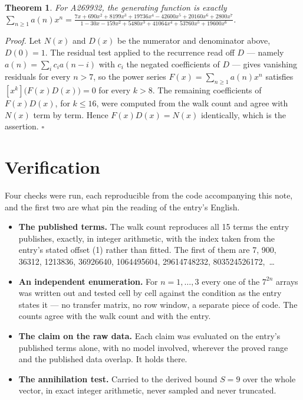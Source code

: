 \documentclass[11pt]{article}
\newtheorem{theorem}{Theorem}
\theoremstyle{definition}
\begin{document}
\begin{theorem} For A269932, the generating function is exactly $\sum_{n\ge 1} a(n)x^n = \frac{7x + 690x^{2} + 8199x^{3} + 19736x^{4} - 42600x^{5} + 20160x^{6} + 2800x^{7}}{1 - 30x - 159x^{2} + 5480x^{3} + 41064x^{4} + 53760x^{5} + 19600x^{6}}$.\end{theorem}

{\itshape Proof.} Let $N(x)$ and $D(x)$ be the numerator and denominator above, $D(0)=1$. The residual test applied to the recurrence read off $D$ --- namely $a(n) = \sum_i c_i a(n-i)$ with $c_i$ the negated coefficients of $D$ --- gives vanishing residuals for every $n > 7$, so the power series $F(x)=\sum_{n\ge 1}a(n)x^n$ satisfies $[x^k]\bigl(F(x)D(x)\bigr) = 0$ for every $k > 8$. The remaining coefficients of $F(x)D(x)$, for $k \le 16$, were computed from the walk count and agree with $N(x)$ term by term. Hence $F(x)D(x) = N(x)$ identically, which is the assertion. $\square$

\section{Verification}

Four checks were run, each reproducible from the code accompanying this note, and the first two are what pin the reading of the entry's English.

\begin{itemize}

\item {\bfseries The published terms.} The walk count reproduces all 15 terms the entry publishes, exactly, in integer arithmetic, with the index taken from the entry's stated offset (1) rather than fitted. The first of them are 7, 900, 36312, 1213836, 36926640, 1064495604, 29614748232, 803524526172,~\dots

\item {\bfseries An independent enumeration.} For $n = 1,\dots,3$ every one of the $7^{2n}$ arrays was written out and tested cell by cell against the condition as the entry states it --- no transfer matrix, no row window, a separate piece of code. The counts agree with the walk count and with the entry.

\item {\bfseries The claim on the raw data.} Each claim was evaluated on the entry's published terms alone, with no model involved, wherever the proved range and the published data overlap. It holds there.

\item {\bfseries The annihilation test.} Carried to the derived bound $S = 9$ over the whole vector, in exact integer arithmetic, never sampled and never truncated.

\end{itemize}
\end{document}
